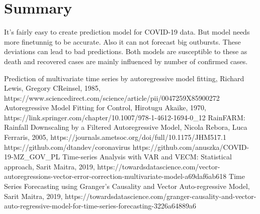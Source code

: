 \documentclass[conference]{IEEEtran}
\begin{document}
\section{Summary}
It's fairly easy to create prediction model for COVID-19 data. But model needs more finetunnig to be accurate. Also it can not forecast big outbursts. These deviations can lead to 
bad predictions. Both models are susceptible to these as death and recovered cases are mainly influenced by number of confirmed cases.


\begin{thebibliography}{00}
 Prediction of multivariate time series by autoregressive model fitting, Richard Lewis, Gregory CReinsel, 1985, https://www.sciencedirect.com/science/article/pii/0047259X85900272
 Autoregressive Model Fitting for Control, Hirotugu Akaike, 1970, https://link.springer.com/chapter/10.1007/978-1-4612-1694-0\_12
 RainFARM: Rainfall Downscaling by a Filtered Autoregressive Model, Nicola Rebora, Luca Ferraris, 2005, https://journals.ametsoc.org/doi/full/10.1175/JHM517.1
 https://github.com/dtandev/coronavirus
 https://github.com/anuszka/COVID-19-MZ\_GOV\_PL
 Time-series Analysis with VAR and VECM: Statistical approach, Sarit Maitra, 2019, https://towardsdatascience.com/vector-autoregressions-vector-error-correction-multivariate-model-a69daf6ab618
 Time Series Forecasting using Granger’s Causality and Vector Auto-regressive Model, Sarit Maitra, 2019, https://towardsdatascience.com/granger-causality-and-vector-auto-regressive-model-for-time-series-forecasting-3226a64889a6
\end{thebibliography}
\vspace{12pt}
\end{document}
